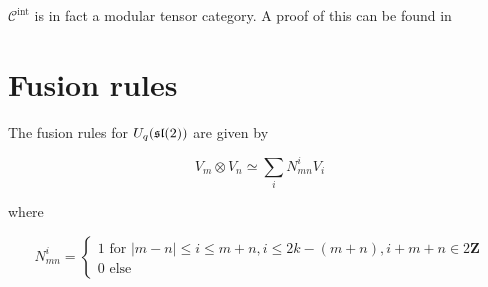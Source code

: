 $\mathcal{C}^\text{int}$ is in fact a modular tensor category. A proof of this
can be found in \cite{Kirillov} 
 
\section{Fusion rules}

The fusion rules for $U_q(\mathfrak{sl}(2))$ are given by 

\begin{equation}
    V_m \otimes V_n \simeq \sum_i N_{mn}^i V_i
\end{equation}

where 

\begin{equation}
    N_{mn}^i = \begin{cases} 1 \text{ for } |m-n| \leq i \leq m+n, i \leq 2k - (m+n), i + m + n \in 2 \mathbf{Z} \\
                             0 \text{ else } 
               \end{cases}
\end{equation}



